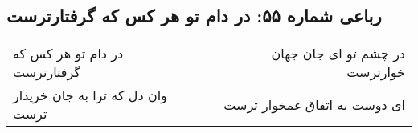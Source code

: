 \begin{center}
\section*{رباعی شماره ۵۵: در دام تو هر کس که گرفتارترست}
\label{sec:sh055}
\begin{longtable}{l p{0.5cm} r}
در دام تو هر کس که گرفتارترست
&&
در چشم تو ای جان جهان خوارترست
\\
وان دل که ترا به جان خریدار ترست
&&
ای دوست به اتفاق غمخوار ترست
\\
\end{longtable}
\end{center}
